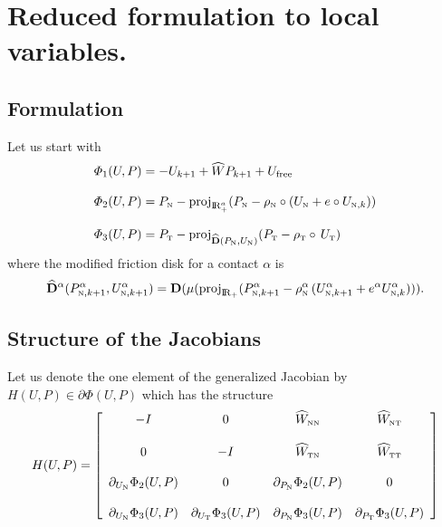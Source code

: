 
\section{Reduced formulation to local variables.}

\subsection{Formulation}

Let us start with
\begin{equation}
  \label{eq:AC-L7}
  \begin{array}{l}
  \varPhi_1(U,P) =  - U_{k+1}  + \widehat W P_{k+1}  + U_{\mathrm{free}}\\ \\
  \varPhi_2(U,P) =  P_{{\hbox{\tiny{N}}}} - \operatorname{proj}_{\mathrm{I\!R}^{a}_+} (P_{{\hbox{\tiny{N}}}} - \rho_{{\hbox{\tiny{N}}}}\circ (U_{{\hbox{\tiny{N}}}} +e \circ  U_{{\hbox{\tiny{N}}},k}) ) \\ \\
  \varPhi_3(U,P) =  P_{{\hbox{\tiny{T}}}} - \operatorname{proj}_{\widehat {\bf D}(P_{{\hbox{\tiny{N}}}},U_{{\hbox{\tiny{N}}}})} (P_{{{\hbox{\tiny{T}}}}} - \rho_{{\hbox{\tiny{T}}}}\circ \,U_{{\hbox{\tiny{T}}}} )
\end{array}
\end{equation}
where the modified friction disk for a contact $\alpha$ is
\begin{equation}\label{eq:AC-L3}
  \widehat {\bf D}^\alpha(P^\alpha_{{\hbox{\tiny{N}}},k+1},U_{{\hbox{\tiny{N}}},k+1}^{\alpha}) = {\bf D}(\mu(\operatorname{proj}_{\mathrm{I\!R}_+} (P^\alpha_{{\hbox{\tiny{N}}},k+1} - \rho^\alpha_{{\hbox{\tiny{N}}}}\,(U_{{\hbox{\tiny{N}}},k+1}^{\alpha}+e^\alpha U_{{\hbox{\tiny{N}}},k}^{\alpha}) )).
\end{equation}
\subsection{Structure of the Jacobians}

Let us denote the one element of the  generalized Jacobian by  $ H(U,P) \in \partial \Phi(U,P)$ which has the structure
\begin{equation}
  \label{eq:AC-L6}
   H(U,P) =
   \left[\begin{array}{cccc}
       - I & 0 &  \widehat W_{{\hbox{\tiny{N}}}{\hbox{\tiny{N}}}} & \widehat W_{{\hbox{\tiny{N}}}{\hbox{\tiny{T}}}} \\ \\
       0  & -I  &  \widehat W_{{\hbox{\tiny{T}}}{\hbox{\tiny{N}}}} & \widehat W_{{\hbox{\tiny{T}}}{\hbox{\tiny{T}}}} \\ \\
       \partial_{U_{{\hbox{\tiny{N}}}}} \Phi_2(U,P) & 0 &   \partial_{P_{{\hbox{\tiny{N}}}}} \Phi_2(U,P) & 0 \\ \\
       \partial_{U_{{\hbox{\tiny{N}}}}} \Phi_3(U,P) &  \partial_{U_{{\hbox{\tiny{T}}}}} \Phi_3(U,P) &  \partial_{P_{{\hbox{\tiny{N}}}}} \Phi_3(U,P)  & \partial_{P_{{\hbox{\tiny{T}}}}} \Phi_3(U,P)
   \end{array}\right]
\end{equation}


